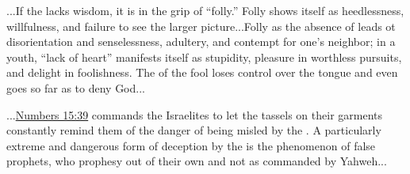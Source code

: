 			...If the  lacks wisdom, it is in the grip of ``folly.'' Folly shows itself as heedlessness, willfulness, and failure to see the larger picture...Folly as the absence of  leads ot disorientation and senselessness, adultery, and contempt for one's neighbor; in a youth, ``lack of heart'' manifests itself as stupidity, pleasure in worthless pursuits, and delight in foolishness. The  of the fool loses control over the tongue and even goes so far as to deny God...
			
			...\hyperref[NUMBERS-15-39]{Numbers 15:39} commands the Israelites to let the tassels on their garments constantly remind them of the danger of being misled by the . A particularly extreme and dangerous form of deception by the  is the phenomenon of false prophets, who prophesy out of their own  and not as commanded by Yahweh...